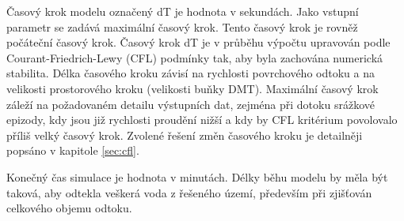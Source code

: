Časový krok modelu označený \acs{dT} je hodnota v sekundách. Jako vstupní parametr se zadává maximální časový krok. Tento časový krok je rovněž počáteční časový krok. Časový krok \acs{dT} je v průběhu výpočtu upravován podle Courant-Friedrich-Lewy (\acs{CFL}) podmínky tak, aby byla zachována numerická stabilita. Délka časového kroku závisí na rychlosti povrchového odtoku a na velikosti prostorového kroku (velikosti buňky DMT). Maximální časový krok záleží na požadovaném detailu výstupních dat, zejména při dotoku srážkové epizody, kdy jsou již rychlosti proudění nižší a kdy by \acs{CFL} kritérium povolovalo příliš velký časový krok. Zvolené řešení změn časového kroku je detailněji popsáno v kapitole \ref{sec:cfl}. 



Konečný čas simulace je hodnota v minutách. Délky běhu modelu by měla být taková, aby odtekla veškerá voda z řešeného území, především při zjišťován celkového objemu odtoku.
 



